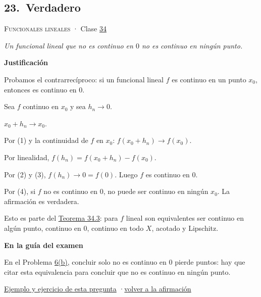 \documentclass[11pt,a4paper]{article}
\newcommand{\bloque}[1]{\par\smallskip\noindent\textbf{\color{acento}#1}\par}
\begin{document}
\subsection*{\hypertarget{r-23}{}23.\ \textcolor{ok}{Verdadero}}
{\small \textsc{Funcionales lineales} · Clase \href{https://decostruttivismo.github.io/MAT2514-repaso/pdf/MAT2514_apuntes_completos.pdf\#nameddest=section.34}{34}}\par
\emph{Un funcional lineal que no es continuo en $0$ no es continuo en ningún punto.}
\bloque{Justificación}
\begin{pasos}
\item[] Probamos el contrarrecíproco: si un funcional lineal $f$ es continuo en un punto $x_0$, entonces es continuo en $0$.
\item[] Sea $f$ continuo en $x_0$ y sea $h_n\to0$.
\item[(1)] $x_0+h_n\to x_0$.
\item[(2)] Por (1) y la continuidad de $f$ en $x_0$: $f(x_0+h_n)\to f(x_0)$.
\item[(3)] Por linealidad, $f(h_n)=f(x_0+h_n)-f(x_0)$.
\item[(4)] Por (2) y (3), $f(h_n)\to0=f(0)$. Luego $f$ es continuo en $0$.
\item[] Por (4), si $f$ no es continuo en $0$, no puede ser continuo en ningún $x_0$. La afirmación es verdadera.
\item[] Esto es parte del \href{https://decostruttivismo.github.io/MAT2514-repaso/pdf/MAT2514_apuntes_completos.pdf\#nameddest=teorema.34.3}{Teorema 34.3}: para $f$ lineal son equivalentes ser continuo en algún punto, continuo en $0$, continuo en todo $X$, acotado y Lipschitz.
\end{pasos}
\bloque{En la guía del examen}
\begin{pasos}
\item[] En el Problema \hyperlink{prob-6}{6(b)}, concluir solo \guillemotleft{}no es continuo en $0$\guillemotright{} pierde puntos: hay que citar esta equivalencia para concluir que no es continuo en ningún punto.
\end{pasos}
\par{}
\par{\small \hyperlink{e-23}{Ejemplo y ejercicio de esta pregunta} \quad·\quad \hyperlink{q-23}{volver a la afirmación}}
\end{document}
